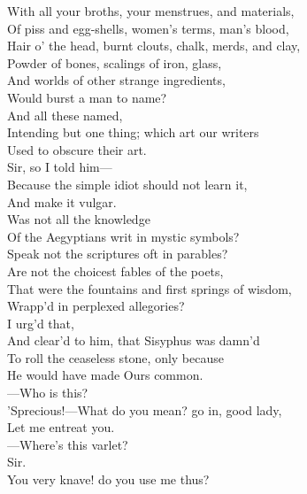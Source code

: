\documentclass[a4paper,oneside]{memoir}
\begin{document}
\begin{drama*}
With all your broths, your menstrues, and materials,\\
Of piss and egg-shells, women's terms, man's blood,\\
Hair o' the head, burnt clouts, chalk, merds, and clay,\\
Powder of bones, scalings of iron, glass,\\
And worlds of other strange ingredients,\\
Would burst a man to name?\\
\subtlespeaks {} And all these named,\\
Intending but one thing; which art our writers\\
Used to obscure their art.\\
\mammonspeaks {} Sir, so I told him---\\
Because the simple idiot should not learn it,\\
And make it vulgar.\\
\subtlespeaks {} Was not all the knowledge\\
Of the Aegyptians writ in mystic symbols?\\
Speak not the scriptures oft in parables?\\
Are not the choicest fables of the poets,\\
That were the fountains and first springs of wisdom,\\
Wrapp'd in perplexed allegories?\\
\mammonspeaks {} I urg'd that,\\
And clear'd to him, that Sisyphus was damn'd\\
To roll the ceaseless stone, only because\\
He would have made Ours common.\\
 ---Who is this?\\
\subtlespeaks 'Sprecious!---What do you mean? go in, good lady,\\
Let me entreat you.\\
 ---Where's this varlet?\\
\facespeaks {} Sir.\\
\subtlespeaks You very knave! do you use me thus?\\

\end{drama*}
\end{document}
